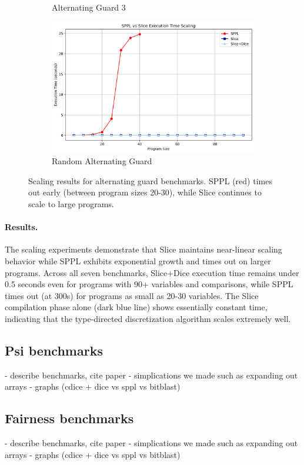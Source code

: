 \begin{figure}[!t]
\begin{subfigure}{0.48\textwidth}
\caption{Alternating Guard 3}
\end{subfigure}
\hfill
\begin{subfigure}{0.48\textwidth}
\includegraphics[width=\textwidth]{../images/scaling/build_random_alternating_guard_contdice.png}
\caption{Random Alternating Guard}
\end{subfigure}
\caption{Scaling results for alternating guard benchmarks. SPPL (red) times out early (between program sizes 20-30), while Slice continues to scale to large programs.}
\label{fig:alt-benchmarks}
\end{figure}

\paragraph{Results.} The scaling experiments demonstrate that Slice maintains near-linear scaling behavior while SPPL exhibits exponential growth and times out on larger programs. Across all seven benchmarks, Slice+Dice execution time remains under 0.5 seconds even for programs with 90+ variables and comparisons, while SPPL times out (at 300s) for programs as small as 20-30 variables. The Slice compilation phase alone (dark blue line) shows essentially constant time, indicating that the type-directed discretization algorithm scales extremely well.

\subsection{Psi benchmarks}\label{sec:psi-benchmarks}
- describe benchmarks, cite paper
- simplications we made such as expanding out arrays
- graphs (cdice + dice vs sppl vs bitblast)


\subsection{Fairness benchmarks}\label{sec:fairness-benchmarks}
- describe benchmarks, cite paper
- simplications we made such as expanding out arrays
- graphs (cdice + dice vs sppl vs bitblast)

